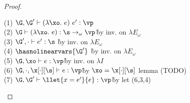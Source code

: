 \begin{proof}
\begin{description}

\begin{tabbing}
    (1) $\G,\G' \vdash (\lambda \xo.~e)~e' : \vp$\\
    (2) $\G \vdash (\lambda \xo.~e) : \s \to_\omega \vp$\` by inv. on $\lambda E_\omega$\\
    (3) $\G', \cdot \vdash e' : \s$ \` by inv. on $\lambda E_\omega$\\
    (4) $\hasnolinearvars{\G'}$ \` by inv. on $\lambda E_\omega$\\
    (5) $\G,\xo \vdash e : \vp$\` by inv. on $\lambda I$\\
    (6) $\G, \cdot, \x[\cdot][\s] \vdash e : \vp$\` by $\xo = \x[\cdot][\s]$ lemma (TODO)\\
    (7) $\G,\G' \vdash \llet{x = e'}{e} : \vp$\` by let (6,3,4)\\
\end{tabbing}
\end{description}
\end{proof}



